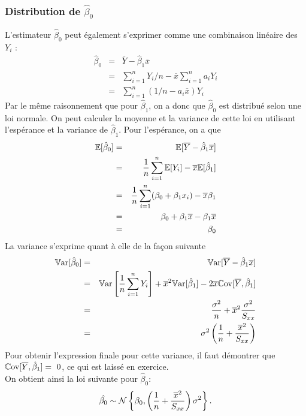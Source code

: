 \subsubsection{Distribution de $\hat\beta_0$}
\label{DistributionBeta0}
L'estimateur $\hat\beta_0$ peut également s'exprimer comme une combinaison linéaire des $Y_i$ :
\begin{eqnarray*}
 \hat{\beta}_0 &=& \overline{Y} - \hat{\beta}_1 \overline{x} \\
 &=& \sum_{i=1}^n Y_i /n - \overline{x} \sum_{i=1}^n a_i Y_i \\
 &=& \sum_{i=1}^n (1/n - a_i \overline{x}) Y_i
\end{eqnarray*}
Par le même raisonnement que pour $\hat\beta_1$, on a donc que $\hat\beta_0$ est distribué selon une loi normale. On peut calculer la moyenne et la variance de cette loi en utilisant l'espérance et la variance de $\hat\beta_1$. Pour l'espérance, on a que
\begin{eqnarray*}
 \mathbb{E}[\hat{\beta}_0] &=& \mathbb{E}[\overline{Y} - \hat{\beta}_1 \overline{x}] \\
 &=& \frac{1}{n}\sum_{i=1}^n \mathbb{E}[Y_i] - \overline{x} \mathbb{E}[\hat{\beta}_1]  \\
 &=& \frac{1}{n}\sum_{i=1}^n(\beta_0+\beta_1 x_i)-\overline{x}\beta_1 \\
 & = & \beta_0+\beta_1 \overline x-\beta_1\overline x \\
 & = & \beta_0
\end{eqnarray*}
La variance s'exprime quant à elle de la façon suivante
\begin{eqnarray*}
 \mathbb{V}\text{ar}[\hat{\beta}_0] &=& \mathbb{V}\text{ar}[\overline{Y} - \hat{\beta}_1 \overline{x}] \\
 &=& \mathbb{V}\text{ar}\left[\frac{1}{n}\sum_{i=1}^n Y_i\right]+ \overline{x}^2 \mathbb{V}\text{ar}[\hat{\beta}_1]-2\overline x\mathbb{C}\text{ov}[\overline Y,\hat\beta_1]  \\
 &=& \frac{\sigma^2}{n}+\overline{x}^2\frac{\sigma^2}{S_{xx}} \\
 & = & \sigma^2\left(\frac{1}{n}+\frac{\overline{x}^2}{S_{xx}}\right)
\end{eqnarray*}
Pour obtenir l'expression finale pour cette variance, il faut démontrer que $\mathbb{C}\text{ov}[\overline Y,\hat\beta_1]=~0$, ce qui est laissé en exercice. \\

On obtient ainsi la loi suivante pour $\hat\beta_0$:
\begin{eqnarray}
\label{distbeta0}
 \hat{\beta_0} \sim \mathcal{N}\left\{\beta_0, \left(\frac{1}{n}+\frac{\overline{x}^2}{S_{xx}}\right)\sigma^2\right\}.
\label{loibeta0}
\end{eqnarray}

